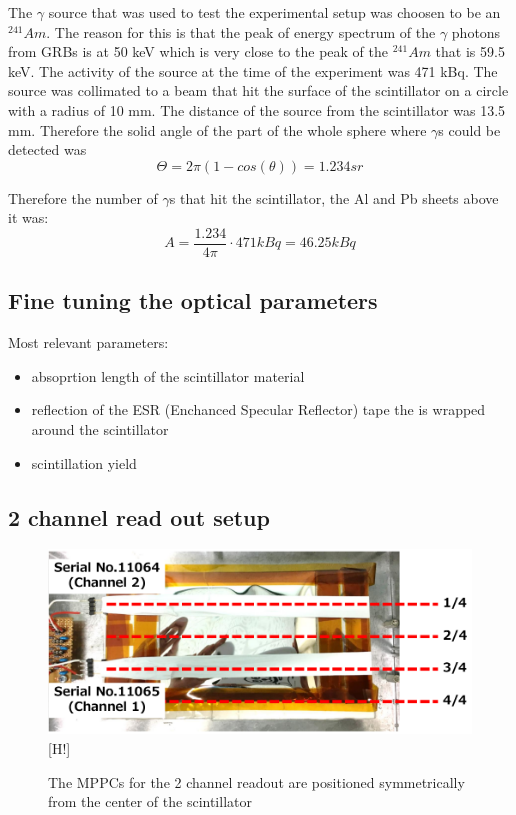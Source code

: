 \documentclass[12pt, a4paper,titlepage]{article}
\numberwithin{equation}{section}
\numberwithin{figure}{section}
\begin{document}
The $\gamma$ source that was used to test the experimental setup was choosen to be an $^{241}Am$. The reason for this is that the peak of energy spectrum of the $\gamma$ photons from GRBs is at 50 keV which is very close to the peak of the $^{241}Am$ that is 59.5 keV. The activity of the source at the time of the experiment was 471 kBq. The source was collimated to a beam that hit the surface of the scintillator on a circle with a radius of 10 mm. The distance of the source from the scintillator was 13.5 mm. Therefore the solid angle of the part of the whole sphere where $\gamma$s could be detected was 
$$\Theta = 2 \pi (1-cos(\theta)) = 1.234 sr$$

 Therefore the number of $\gamma$s that hit the scintillator, the Al and Pb sheets above it was:
$$A = \frac{1.234}{4 \pi} \cdot 471 kBq = 46.25 kBq$$



\subsection{Fine tuning the optical parameters}

Most relevant parameters:
\begin{itemize}
\item absoprtion length of the scintillator material
\item reflection of the ESR (Enchanced Specular Reflector) tape the is wrapped around the scintillator 
\item scintillation yield
\end{itemize}

\pagebreak

\subsection{2 channel read out setup}

\begin{figure}
\centering
\includegraphics[width=130.0mm]{images/2channelsetup.png}[H!]
\caption{The MPPCs for the 2 channel readout are positioned symmetrically from the center of the scintillator}
\end{figure}
\end{document}
